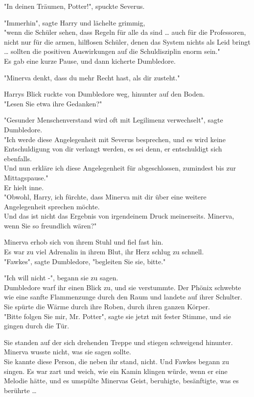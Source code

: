 {"In deinen Träumen, Potter!", spuckte Severus.

"Immerhin", sagte Harry und lächelte grimmig,\\ "wenn die Schüler sehen, dass Regeln für alle da sind … auch für die Professoren, nicht nur für die armen, hilflosen Schüler, denen das System nichts als Leid bringt … sollten die positiven Auswirkungen auf die Schuldisziplin enorm sein."\\ Es gab eine kurze Pause, und dann kicherte Dumbledore.

"Minerva denkt, dass du mehr Recht hast, als dir zusteht."

Harrys Blick ruckte von Dumbledore weg, hinunter auf den Boden.\\ "Lesen Sie etwa ihre Gedanken?"

"Gesunder Menschenverstand wird oft mit Legilimenz verwechselt", sagte Dumbledore.\\ "Ich werde diese Angelegenheit mit Severus besprechen, und es wird keine Entschuldigung von dir verlangt werden, es sei denn, er entschuldigt sich ebenfalls.\\ Und nun erkläre ich diese Angelegenheit für abgeschlossen, zumindest bis zur Mittagspause."\\ Er hielt inne.\\ "Obwohl, Harry, ich fürchte, dass Minerva mit dir über eine weitere Angelegenheit sprechen möchte.\\ Und das ist nicht das Ergebnis von irgendeinem Druck meinerseits. Minerva, wenn Sie so freundlich wären?"

Minerva erhob sich von ihrem Stuhl und fiel fast hin.\\ Es war zu viel Adrenalin in ihrem Blut, ihr Herz schlug zu schnell.\\ "Fawkes", sagte Dumbledore, "begleiten Sie sie, bitte."

"Ich will nicht -", begann sie zu sagen.\\ Dumbledore warf ihr einen Blick zu, und sie verstummte. Der Phönix schwebte wie eine sanfte Flammenzunge durch den Raum und landete auf ihrer Schulter.\\ Sie spürte die Wärme durch ihre Roben, durch ihren ganzen Körper.\\ "Bitte folgen Sie mir, Mr. Potter", sagte sie jetzt mit fester Stimme, und sie gingen durch die Tür.

Sie standen auf der sich drehenden Treppe und stiegen schweigend hinunter. Minerva wusste nicht, was sie sagen sollte.\\ Sie kannte diese Person, die neben ihr stand, nicht. Und Fawkes begann zu singen. Es war zart und weich, wie ein Kamin klingen würde, wenn er eine Melodie hätte, und es umspülte Minervas Geist, beruhigte, besänftigte, was es berührte …

}
